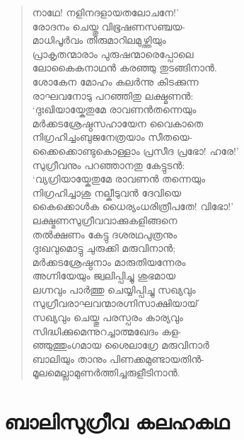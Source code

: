 \begin{verse}
നാഥേ! നളിനദളായതലോചനേ!’\\
രോദനം ചെയ്തു വിഭൂഷണസഞ്ചയ-\\
മാധിപൂര്‍വം തിരുമാറിലമുഴ്ത്തിയും\\
പ്രാകൃതന്മാരാം പുരുഷന്മാരെപ്പോലെ\\
ലോകൈകനാഥന്‍ കരഞ്ഞു തുടങ്ങിനാന്‍.\\
ശോകേന മോഹം കലര്‍ന്നു കിടക്കുന്ന\\
രാഘവനോടു പറഞ്ഞിതു ലക്ഷ്മണന്‍:\\
‘ദുഃഖിയായ്കേതുമേ രാവണന്‍തന്നെയും\\
മര്‍ക്കടശ്രേഷ്ഠസഹായേന വൈകാതെ\\
നിഗ്രഹിച്ചംബുജനേത്രയാം സീതയെ-\\
ക്കൈക്കൊണ്ടുകൊള്ളാം പ്രസീദ പ്രഭോ! ഹരേ!’\\
സുഗ്രീവനും പറഞ്ഞാനതു കേട്ടുടന്‍:\\
‘വ്യഗ്രിയായ്കേതുമേ രാവണന്‍ തന്നെയും\\
നിഗ്രഹിച്ചാശു നല്കീടുവന്‍ ദേവിയെ\\
കൈക്കൊള്‍ക ധൈര്യംധരിത്രീപതേ! വിഭോ!’\\
ലക്ഷ്മണസുഗ്രീവവാക്കുകളിങ്ങനെ\\
തല്‍ക്ഷണം കേട്ടു ദശരഥപുത്രനും\\
ദുഃഖവുമൊട്ടു ചുരുക്കി മരുവിനാന്‍;\\
മര്‍ക്കടശ്രേഷ്ഠനാം മാരുതിയന്നേരം\\
അഗ്നിയേയും ജ്വലിപ്പിച്ചു ശുഭമായ\\
ലഗ്നവും പാര്‍ത്തു ചെയ്യിപ്പിച്ചു സഖ്യവും\\
സുഗ്രീവരാഘവന്മാരഗ്നിസാക്ഷിയായ്\\
സഖ്യവും ചെയ്തു പരസ്പരം കാര്യവും\\
സിദ്ധിക്കുമെന്നുറച്ചാത്മഖേദം കള-\\
ഞ്ഞുത്തുംഗമായ ശൈലാഗ്രേ മരുവിനാര്‍\\
ബാലിയും താനും പിണക്കമുണ്ടായതിന്‍-\\
മൂലമെല്ലാമുണര്‍ത്തിച്ചരുളീടിനാന്‍.
\end{verse}


\section{ബാലിസുഗ്രീവ കലഹകഥ}

